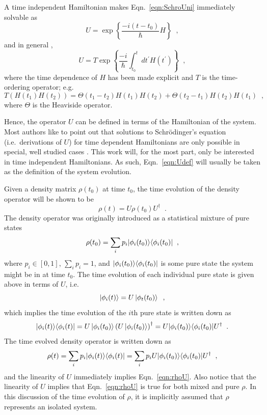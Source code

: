 A time independent Hamiltonian makes Eqn.\ \ref{eqn:SchroUni} immediately solvable as 
\begin{equation}
\label{eqn:Udef}
U = \operatorname{exp}\left\{\frac{-i (t-t_0)}{\hbar} H \right\}\;\;,
\end{equation}
and in general \cite{Sakurai2010}, 
$$
U = T \operatorname{exp}\left\{ \frac{-i}{\hbar} \int_{t_0}^t dt^\prime H(t^\prime)\right\}\;\;,
$$
where the time dependence of $H$ has been made explicit and $T$ is the time-ordering operator; e.g.\
$$
T(H(t_1)H(t_2)) = \Theta(t_1-t_2)H(t_1)H(t_2)+\Theta(t_2-t_1)H(t_2)H(t_1)\;\;,
$$
where $\Theta$ is the Heaviside operator.  

Hence, the operator $U$ can be defined in terms of the Hamiltonian of the system.  Most authors like to point out that solutions to Schr\"{o}dinger's equation (i.e.\ derivations of $U$) for time dependent Hamiltonians are only possible in special, well studied cases \cite{Sakurai2010}.  This work will, for the most part, only be interested in time independent Hamiltonians.  As such, Eqn.\ \ref{eqn:Udef} will usually be taken as the definition of the system evolution.

Given a density matrix $\rho(t_0)$ at time $t_0$, the time evolution of the density operator will be shown to be
\begin{equation}
\label{eqn:rhoU}
\rho(t) = U\rho(t_0)U^\dagger\;\;.
\end{equation}
The density operator was originally introduced as a statistical mixture of pure states
$$
\rho(t_0) = \sum_i p_i |\phi_i(t_0)\rangle\langle\phi_i(t_0)|\;\;,
$$
where $p_i\in[0,1]$, $\sum_i p_i = 1$, and $|\phi_i(t_0)\rangle\langle\phi_i(t_0)|$ is some pure state the system might be in at time $t_0$.  The time evolution of each individual pure state is given above in terms of $U$, i.e.\
$$
\left|\phi_i(t)\right\rangle = U \left|\phi_t(t_0)\right\rangle\;\;,
$$
which implies the time evolution of the $i$th pure state is written down as
$$
|\phi_i(t)\rangle\langle\phi_i(t)| = U\left|\phi_i(t_0)\right\rangle\left(U\left|\phi_i(t_0)\right\rangle\right)^\dagger = U|\phi_i(t_0)\rangle\langle\phi_i(t_0)|U^\dagger\;\;.
$$
The time evolved density operator is written down as
$$
\rho(t) = \sum_i p_i |\phi_i(t)\rangle\langle\phi_i(t)| = \sum_i p_i U|\phi_i(t_0)\rangle\langle\phi_i(t_0)|U^\dagger\;\;,
$$
and the linearity of $U$ immediately implies Eqn.\ \ref{eqn:rhoU}.  Also notice that the linearity of $U$ implies that Eqn.\ \ref{eqn:rhoU} is true for both mixed and pure $\rho$.  In this discussion of the time evolution of $\rho$, it is implicitly assumed that $\rho$ represents an isolated system.
 
